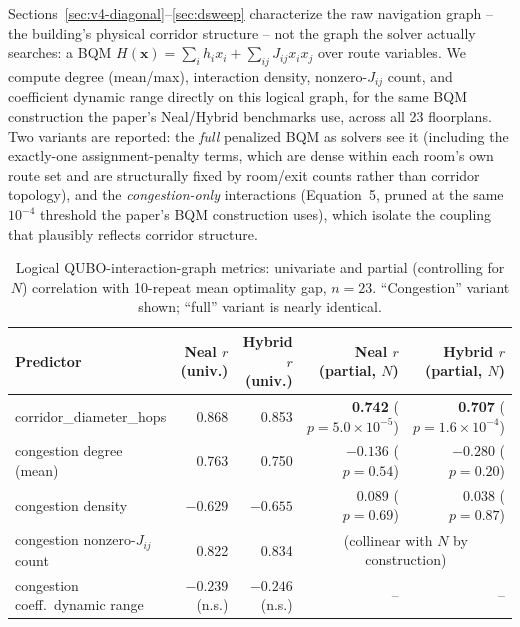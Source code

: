 \documentclass[11pt]{article}
\begin{document}
Sections~\ref{sec:v4-diagonal}--\ref{sec:dsweep} characterize the raw navigation graph -- the building's physical corridor structure -- not the graph the solver actually searches: a BQM $H(\mathbf{x}) = \sum_i h_i x_i + \sum_{ij} J_{ij} x_i x_j$ over route variables. We compute degree (mean/max), interaction density, nonzero-$J_{ij}$ count, and coefficient dynamic range directly on this logical graph, for the same BQM construction the paper's Neal/Hybrid benchmarks use, across all 23 floorplans. Two variants are reported: the \emph{full} penalized BQM as solvers see it (including the exactly-one assignment-penalty terms, which are dense within each room's own route set and are structurally fixed by room/exit counts rather than corridor topology), and the \emph{congestion-only} interactions (Equation~5, pruned at the same $10^{-4}$ threshold the paper's BQM construction uses), which isolate the coupling that plausibly reflects corridor structure.

\begin{table}[h]
\centering
\caption{Logical QUBO-interaction-graph metrics: univariate and partial (controlling for $N$) correlation with 10-repeat mean optimality gap, $n=23$. ``Congestion'' variant shown; ``full'' variant is nearly identical.}
\label{tab:qubograph}
\small
\begin{tabular}{lrrrr}
\toprule
Predictor & Neal $r$ (univ.) & Hybrid $r$ (univ.) & Neal $r$ (partial, $N$) & Hybrid $r$ (partial, $N$) \\
\midrule
corridor\_diameter\_hops & 0.868 & 0.853 & \textbf{0.742} ($p=5.0\times10^{-5}$) & \textbf{0.707} ($p=1.6\times10^{-4}$) \\
congestion degree (mean) & 0.763 & 0.750 & $-0.136$ ($p=0.54$) & $-0.280$ ($p=0.20$) \\
congestion density & $-0.629$ & $-0.655$ & $0.089$ ($p=0.69$) & $0.038$ ($p=0.87$) \\
congestion nonzero-$J_{ij}$ count & 0.822 & 0.834 & \multicolumn{2}{c}{(collinear with $N$ by construction)} \\
congestion coeff.\ dynamic range & $-0.239$ (n.s.) & $-0.246$ (n.s.) & -- & -- \\
\bottomrule
\end{tabular}
\end{table}
\end{document}
